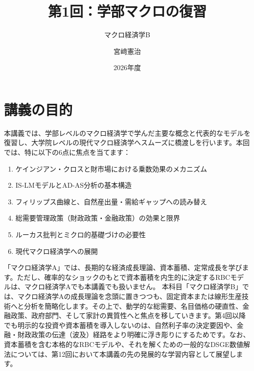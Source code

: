 \documentclass[
  japanese,
  lualatex,
  ja=standard,
  12pt,
  a4paper]{ltjsarticle}
\title{第1回：学部マクロの復習}
\subtitle{マクロ経済学B}
\author{宮﨑憲治}
\date{2026年度}
\providecommand{\tightlist}{%
  \setlength{\itemsep}{0pt}\setlength{\parskip}{0pt}}
\renewcommand*\contentsname{目次}
\newcommand\contentsname{目次}
\begin{document}
\maketitle

\renewcommand*\contentsname{目次}
{
\setcounter{tocdepth}{3}
\tableofcontents
}

\section{講義の目的}\label{ux8b1bux7fa9ux306eux76eeux7684}

本講義では、学部レベルのマクロ経済学で学んだ主要な概念と代表的なモデルを復習し、大学院レベルの現代マクロ経済学へスムーズに橋渡しを行います。本回では、特に以下の6点に焦点を当てます：

\begin{enumerate}
\def\labelenumi{\arabic{enumi}.}
\tightlist
\item
  ケインジアン・クロスと財市場における乗数効果のメカニズム
\item
  IS-LMモデルとAD-AS分析の基本構造
\item
  フィリップス曲線と、自然産出量・需給ギャップへの読み替え
\item
  総需要管理政策（財政政策・金融政策）の効果と限界
\item
  ルーカス批判とミクロ的基礎づけの必要性
\item
  現代マクロ経済学への展開
\end{enumerate}

\begin{tcolorbox}[enhanced jigsaw, arc=.35mm, bottomrule=.15mm, bottomtitle=1mm, breakable, colback=white, colbacktitle=quarto-callout-note-color!10!white, colframe=quarto-callout-note-color-frame, coltitle=black, left=2mm, leftrule=.75mm, opacityback=0, opacitybacktitle=0.6, rightrule=.15mm, title=\textcolor{quarto-callout-note-color}{\faInfo}\hspace{0.5em}{科目の位置づけと前提}, titlerule=0mm, toprule=.15mm, toptitle=1mm]

「マクロ経済学A」では、長期的な経済成長理論、資本蓄積、定常成長を学びます。ただし、確率的なショックのもとで資本蓄積を内生的に決定するRBCモデルは、マクロ経済学Aでも本講義でも扱いません。
本科目「マクロ経済学B」では、マクロ経済学Aの成長理論を念頭に置きつつも、固定資本または線形生産技術へと分析を簡略化します。その上で、動学的な総需要、名目価格の硬直性、金融政策、政府部門、そして家計の異質性へと焦点を移していきます。第4回以降でも明示的な投資や資本蓄積を導入しないのは、自然利子率の決定要因や、金融・財政政策の伝達（波及）経路をより明確に浮き彫りにするためです。なお、資本蓄積を含む本格的なRBCモデルや、それを解くための一般的なDSGE数値解法については、第12回において本講義の先の発展的な学習内容として展望します。

\end{tcolorbox}
\end{document}
